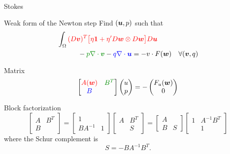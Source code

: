 \begin{frame}[shrink=5]{Stokes}
  \begin{block}{Weak form of the Newton step}
    Find $(\bm u,p)$ such that
    \begin{align*}
      & \int_\Omega
      \color{red}{(D\vv)^T \big[\eta\bm 1 + \eta' D\ww \otimes D\ww\big] D\uu} \\
      &\qquad\quad - {\color{green!55!black}p \nabla\cdot \vv} - {\color{blue} q \nabla\cdot \uu} = - v\cdot F(\ww) & \forall (\vv,q) \\
    \end{align*}
  \end{block}
  \vspace{-2em}
  \begin{block}{Matrix}
    \vspace{-1.5em}
    \[ \begin{bmatrix}\color{red}{A(\ww)} & {\color{green!55!black} B^T}
      \\ {\color{blue} B} & \end{bmatrix}
    \begin{pmatrix} u \\ p \end{pmatrix}
    = - \begin{pmatrix} F_u(\ww) \\ 0 \end{pmatrix} \]
  \end{block}
  \begin{block}{Block factorization}
    \vspace{-1em}
    \[\begin{bmatrix} A & B^T \\ B & \end{bmatrix} =
    \begin{bmatrix} 1 & \\ BA^{-1} & 1 \end{bmatrix}
    \begin{bmatrix} A & B^T \\ & S \end{bmatrix} =
    \begin{bmatrix} A & \\ B & S \end{bmatrix}
    \begin{bmatrix} 1 & A^{-1}B^T \\ & 1 \end{bmatrix}
    \]
    where the Schur complement is
    \[  S = -B A^{-1} B^T . \]
  \end{block}
\end{frame}
